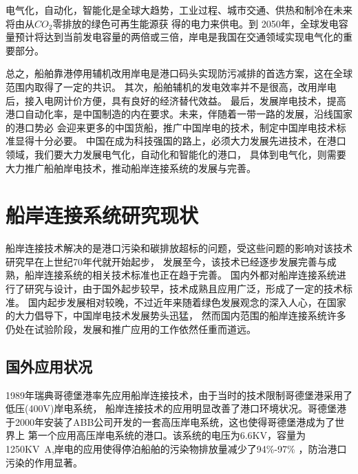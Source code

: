 \begin{table}[!htp]
	\centering
	\caption[中国岸电替代辅机发电的减排表现]{中国岸电替代辅机发电的减排表现\cite{SP3}}
	\label{tab:岸电替代效益}
\end{table}

电气化，自动化，智能化是全球大趋势，工业过程、城市交通、供热和制冷在未来将由从$CO_{2}$零排放的绿色可再生能源获
得的电力来供电。到 2050年，全球发电容量预计将达到当前发电容量的两倍或三倍，岸电是我国在交通领域实现电气化的重要部分。

总之，船舶靠港停用辅机改用岸电是港口码头实现防污减排的首选方案，这在全球范围内取得了一定的共识。
其次，船舶辅机的发电效率并不是很高，改用岸电后，接入电网计价方便，具有良好的经济替代效益。
最后，发展岸电技术，提高港口自动化率，是中国制造的内在要求。未来，伴随着一带一路的发展，沿线国家的港口势必
会迎来更多的中国货船，推广中国岸电的技术，制定中国岸电技术标准显得十分必要。
中国在成为科技强国的路上，必须大力发展先进技术，在港口领域，我们要大力发展电气化，自动化和智能化的港口，
具体到电气化，则需要大力推广船舶岸电技术，推动船岸连接系统的发展与完善。


\section{船岸连接系统研究现状}
船岸连接技术解决的是港口污染和碳排放超标的问题，受这些问题的影响对该技术研究早在上世纪70年代就开始起步，
发展至今，该技术已经逐步发展完善与成熟，船岸连接系统的相关技术标准也正在趋于完善。
国内外都对船岸连接系统进行了研究与设计，由于国外起步较早，技术成熟且应用广泛，形成了一定的技术标准。
国内起步发展相对较晚，不过近年来随着绿色发展观念的深入人心，在国家的大力倡导下，中国岸电技术发展势头迅猛，
然而国内范围的船岸连接系统许多仍处在试验阶段，发展和推广应用的工作依然任重而道远\cite{SP4}。

\subsection{国外应用状况}
1989年瑞典哥德堡港率先应用船岸连接技术，由于当时的技术限制哥德堡港采用了低压(400V)岸电系统，
船岸连接技术的应用明显改善了港口环境状况。哥德堡港于2000年安装了ABB公司开发的一套高压岸电系统，这也使得哥德堡港成为了世界上
第一个应用高压岸电系统的港口。该系统的电压为6.6KV，容量为1250\si{KV.A},岸电的应用使得停泊船舶的污染物排放量减少了94\%-97\%
\cite{SP4}，防治港口污染的作用显著。


